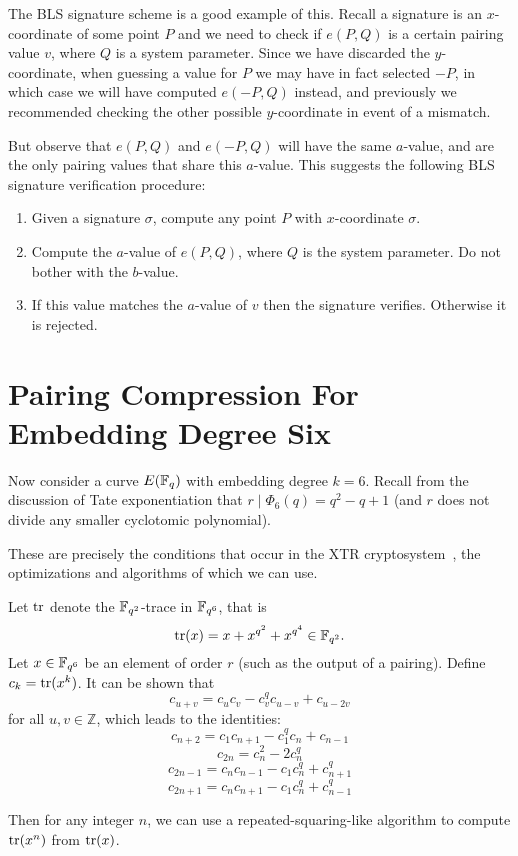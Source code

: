 The BLS signature scheme is a good example of this.
Recall a signature is an $x$-coordinate of some point $P$ and we need to
check if $e(P, Q)$ is a certain pairing value $v$,
where $Q$ is a system parameter.
Since we have discarded the $y$-coordinate, when guessing a value for $P$
we may have in fact selected $-P$, in which case we will have computed
$e(-P, Q)$ instead, and previously we recommended checking the other possible
$y$-coordinate in event of a mismatch.

But observe that $e(P,Q)$ and $e(-P,Q)$ will have the same $a$-value,
and are the only pairing values that share this $a$-value.
This suggests the following BLS signature verification procedure:

\begin{enumerate}
\item
Given a signature $\sigma$, compute any point $P$ with $x$-coordinate $\sigma$.
\item
Compute the $a$-value of $e(P,Q)$, where $Q$ is the system parameter.
Do not bother with the $b$-value.
\item
If this value matches the $a$-value of $v$ then the signature verifies.
Otherwise it is rejected.
\end{enumerate}

\section {Pairing Compression For Embedding Degree Six}

Now consider a curve $E(\mathbb{F}_q)$ with embedding degree $k=6$.
Recall from the discussion of Tate exponentiation that
$r \mid \Phi_6(q) = q^2 - q + 1$ (and $r$ does not divide any
smaller cyclotomic polynomial).

These are precisely the conditions
that occur in the XTR cryptosystem~\cite{xtr}, the
optimizations and algorithms of which we can use.

Let $\mathop{\rm tr}$ denote the $\mathbb{F}_{q^2}$-trace in $\mathbb{F}_{q^6}$,
that is
\[ \mathop{\rm tr}(x) = x + x^{q^2} + x^{q^4}  \in \mathbb{F}_{q^2} .\]
Let $x \in \mathbb{F}_{q^6}$ be an element of order $r$ (such as the output of
a pairing).
Define $c_k = \mathop{\rm tr}(x^k)$.
It can be shown that
\[ c_{u+v} = c_u c_v - c_v^q c_{u-v} + c_{u-2v} \]
for all $u,v\in\mathbb{Z}$,
which leads to the identities:
\[ c_{n+2} = c_1 c_{n+1} - c_1^q c_n + c_{n-1} \]
\[ c_{2n} = c_n^2 - 2c_n^q \]
\[ c_{2n-1} = c_n c_{n-1} - c_1 c_n^q + c_{n+1}^q \]
\[ c_{2n+1} = c_n c_{n+1} - c_1 c_n^q + c_{n-1}^q \]

Then for any integer $n$,
we can use a repeated-squaring-like algorithm
to compute $\mathop{\rm tr}(x^n)$ from $\mathop{\rm tr}(x)$.

